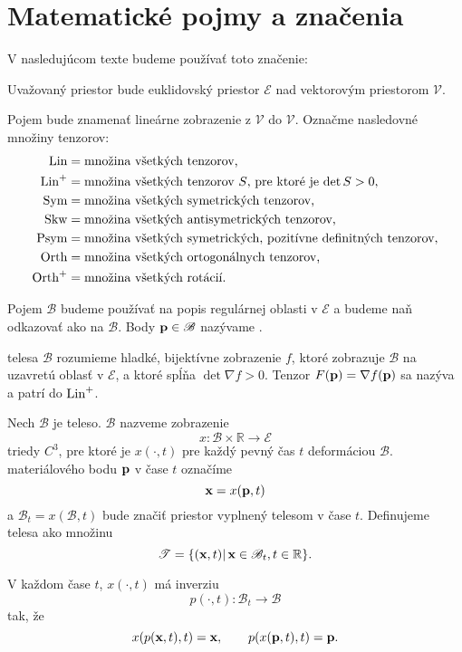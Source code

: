 \chapter{Matematické pojmy a značenia}

V nasledujúcom texte budeme používať toto značenie: 

Uvažovaný priestor bude euklidovský priestor $\mathcal E$ nad vektorovým 
priestorom $\mathcal V$.

Pojem  bude znamenať lineárne zobrazenie z
$\mathcal V$ do $\mathcal V$. Označme nasledovné množiny tenzorov: \[
\begin{split}
\mbox{Lin} &= \mbox{množina všetkých tenzorov,} \\
\mbox{Lin}^+ &= \mbox{množina všetkých tenzorov $S$, pre ktoré je $\det S > 0$,} \\
\mbox{Sym} &= \mbox{množina všetkých symetrických tenzorov,} \\
\mbox{Skw} &= \mbox{množina všetkých antisymetrických tenzorov,} \\
\mbox{Psym} &= \mbox{množina všetkých symetrických, pozitívne definitných tenzorov,}
\\ \mbox{Orth} &= \mbox{množina všetkých ortogonálnych tenzorov,} \\
\mbox{Orth}^+ &= \mbox{množina všetkých rotácií.} \\
\end{split}
\]

Pojem  $\mathcal B$ budeme používať na popis regulárnej  
oblasti v $\mathcal E$ a budeme naň odkazovať ako na  $\mathcal B$. Body $\textbf{p} \in \mathcal B$ nazývame .

 telesa $\mathcal B$ rozumieme hladké, bijektívne zobrazenie $f$, 
ktoré zobrazuje $\mathcal B$ na uzavretú oblasť v $\mathcal E$, a ktoré spĺňa
$\det \nabla f > 0$. Tenzor $F(\textbf{p})=\nabla f(\textbf{p})$ sa nazýva
 a patrí do $\mbox{Lin}^+$.

Nech $\mathcal B$ je teleso.  $\mathcal B$ nazveme zobrazenie 
$$x:\mathcal B \times \mathbb R \rightarrow \mathcal E$$ triedy $C^3$, 
pre ktoré je $x(\cdot,t)$ pre každý pevný čas $t$ deformáciou $\mathcal B$. 
 materiálového bodu $\textbf{p}$ v čase $t$ označíme 
$$\textbf{x}=x(\textbf{p},t)$$ a $\mathcal B_t = x(\mathcal B,t)$ bude značiť priestor
vyplnený telesom v čase $t$. Definujeme  telesa ako množinu
$$\mathcal T=\{(\textbf{x},t)|\,\textbf{x}\in\mathcal B_t,t\in\mathbb R\}.$$

V každom čase $t$, $x(\cdot,t)$ má inverziu $$p(\cdot,t):\mathcal B_t \rightarrow
\mathcal B$$
tak, že $$x(p(\textbf{x},t),t)=\textbf{x}, \qquad p(x(\textbf{p},t),t)=\textbf{p}.$$

